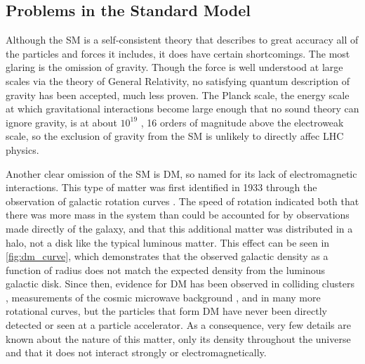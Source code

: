 \subsection{Problems in the Standard Model}
\label{sec:sm_problems}

Although the \ac{SM} is a self-consistent theory that describes to great accuracy all of the particles and forces it includes, it does have certain shortcomings. The most glaring is the omission of gravity. Though the force is well understood at large scales via the theory of General Relativity, no satisfying quantum description of gravity has been accepted, much less proven. The Planck scale, the energy scale at which gravitational interactions become large enough that no sound theory can ignore gravity, is at about $10^{19}$ \GeV, 16 orders of magnitude above the electroweak scale, so the exclusion of gravity from the \ac{SM} is unlikely to directly affec \ac{LHC} physics. 

Another clear omission of the \ac{SM} is \acf{DM}, so named for its lack of electromagnetic interactions. This type of matter was first identified in 1933 through the observation of galactic rotation curves \cite{zwicky}. The speed of rotation indicated both that there was more mass in the system than could be accounted for by observations made directly of the galaxy, and that this additional matter was distributed in a halo, not a disk like the typical luminous matter. This effect can be seen in \autoref{fig:dm_curve}, which demonstrates that the observed galactic density as a function of radius does not match the expected density from the luminous galactic disk. Since then, evidence for \ac{DM} has been observed in colliding clusters \cite{astro-ph/0608407}, measurements of the cosmic microwave background \cite{0803.0732}, and in many more rotational curves, but the particles that form \ac{DM} have never been directly detected or seen at a particle accelerator. As a consequence, very few details are known about the nature of this matter, only its density throughout the universe and that it does not interact strongly or electromagnetically. 

